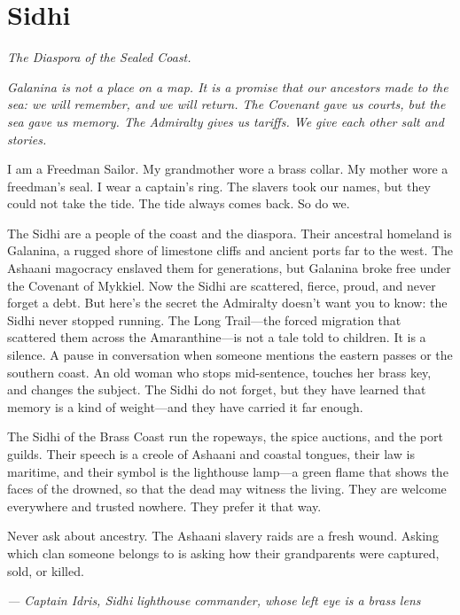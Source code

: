 \newpage

\newpage

\chapter{Sidhi}
\emph{The Diaspora of the Sealed Coast.}

\noindent
{\Large
\textit{Galanina is not a place on a map. It is a promise that our ancestors made to the sea: we will remember, and we will return. The Covenant gave us courts, but the sea gave us memory. The Admiralty gives us tariffs. We give each other salt and stories.}

\vspace{0.5em}

I am a Freedman Sailor. My grandmother wore a brass collar. My mother wore a freedman's seal. I wear a captain's ring. The slavers took our names, but they could not take the tide. The tide always comes back. So do we.

\vspace{0.5em}

The Sidhi are a people of the coast and the diaspora. Their ancestral homeland is Galanina, a rugged shore of limestone cliffs and ancient ports far to the west. The Ashaani magocracy enslaved them for generations, but Galanina broke free under the Covenant of Mykkiel. Now the Sidhi are scattered, fierce, proud, and never forget a debt. But here's the secret the Admiralty doesn't want you to know: the Sidhi never stopped running. The Long Trail---the forced migration that scattered them across the Amaranthine---is not a tale told to children. It is a silence. A pause in conversation when someone mentions the eastern passes or the southern coast. An old woman who stops mid-sentence, touches her brass key, and changes the subject. The Sidhi do not forget, but they have learned that memory is a kind of weight---and they have carried it far enough.

\vspace{0.5em}

The Sidhi of the Brass Coast run the ropeways, the spice auctions, and the port guilds. Their speech is a creole of Ashaani and coastal tongues, their law is maritime, and their symbol is the lighthouse lamp---a green flame that shows the faces of the drowned, so that the dead may witness the living. They are welcome everywhere and trusted nowhere. They prefer it that way.

\vspace{0.5em}

Never ask about ancestry. The Ashaani slavery raids are a fresh wound. Asking which clan someone belongs to is asking how their grandparents were captured, sold, or killed.

\vspace{1em}

\noindent\textit{--- Captain Idris, Sidhi lighthouse commander, whose left eye is a brass lens}
}


